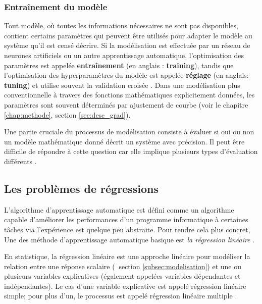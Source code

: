 	\subsubsection{\textbf{Entraînement du modèle}}
	
	Tout modèle, où toutes les informations nécessaires ne sont pas disponibles, contient certains paramètres qui peuvent être utilisés pour adapter le modèle au système qu'il est censé décrire. Si la modélisation est effectuée par un réseau de neurones artificiels ou un autre apprentissage automatique, l'optimisation des paramètres est appelée \textbf{entraînement} (en anglais : \textbf{training}), tandis que l'optimisation des hyperparamètres du modèle est appelée \textbf{réglage} (en anglais: \textbf{tuning}) et utilise souvent la validation croisée \cite{goodfellow2016deep}. Dans une modélisation plus conventionnelle à travers des fonctions mathématiques explicitement données, les paramètres sont souvent déterminés par ajustement de courbe (voir le chapitre \ref{chap:methode}, section \ref{sec:desc_grad}).
	
	Une partie cruciale du processus de modélisation consiste à évaluer si oui ou non un modèle mathématique donné décrit un système avec précision. Il peut être difficile de répondre à cette question car elle implique plusieurs types d'évaluation différents \cite{matloff2017statistical, goodfellow2016deep}.
	
	\subsection{Les problèmes de régressions} \label{sec:regression_problem}
	
	L'algorithme d'apprentissage automatique est défini comme un algorithme capable d'améliorer les performances d'un programme informatique à certaines tâches via l'expérience est quelque peu abstraite. Pour rendre cela plus concret, Une des méthode d'apprentissage automatique basique est \emph{la régression linéaire} \cite{goodfellow2016deep}.
	
	En statistique, la régression linéaire est une approche linéaire pour modéliser la relation entre une réponse scalaire (\cf$ \ $ section \ref{subsec:modelisation}) et une ou plusieurs variables explicatives (également appelées variables dépendantes et indépendantes). Le cas d'une variable explicative est appelé régression linéaire simple; pour plus d'un, le processus est appelé régression linéaire multiple \cite{darlington2016regression}.
	
